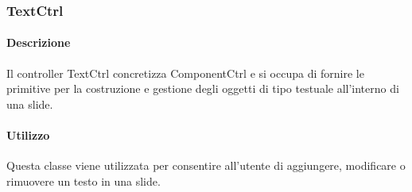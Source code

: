 
\newpage
\subsubsection{TextCtrl}
   \paragraph{Descrizione}
	Il controller TextCtrl concretizza ComponentCtrl e si occupa di fornire le primitive per la costruzione e gestione degli oggetti di tipo testuale all'interno di una slide.
		
	\paragraph{Utilizzo}
	Questa classe viene utilizzata per consentire all'utente di aggiungere, modificare o rimuovere un testo in una slide.
	
